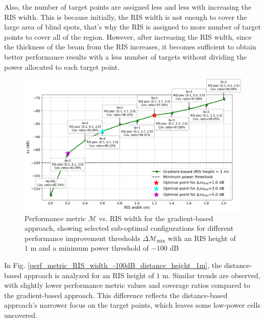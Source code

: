 \documentclass{IEEEoj}
\begin{document}
Also, the number of target points are assigned less and less with increasing the RIS width. This is because initially, the RIS width is not enough to cover the large area of blind spots, that's why the RIS is assigned to more number of target points to cover all of the region. However, after increasing the RIS width, since the thickness of the beam from the RIS increases, it becomes sufficient to obtain better performance results with a less number of targets without dividing the power allocated to each target point.

\begin{figure}
	\centering
	\includegraphics[width=\linewidth]{Sim_Results/perf_metric_RIS_width_-100dB_gradient_height_1m.png}
	\caption{Performance metric $\mathcal{M}$ vs. RIS width for the gradient-based approach, showing selected sub-optimal configurations for different performance improvement thresholds $\Delta \mathcal{M}_{\text{min}}$ with an RIS height of $1$ m and a minimum power threshold of $-100$ dB}
	\label{perf_metric_RIS_width_-100dB_gradient_height_1m}
\end{figure}

In Fig. \ref{perf_metric_RIS_width_-100dB_distance_height_1m}, the distance-based approach is analyzed for an RIS height of $1$ m. Similar trends are observed, with slightly lower performance metric values and coverage ratios compared to the gradient-based approach. This difference reflects the distance-based approach’s narrower focus on the target points, which leaves some low-power cells uncovered.
\end{document}
